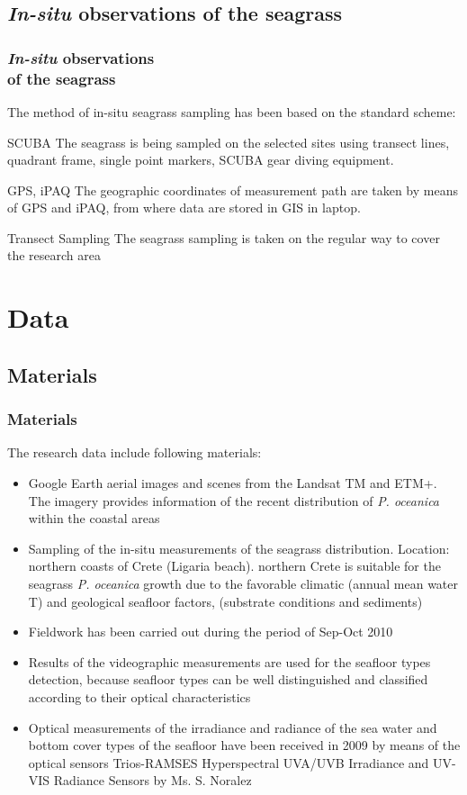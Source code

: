 \documentclass[pdflatex,compress,9pt,
	xcolor={dvipsnames,dvipsnames,svgnames,x11names,table},
	hyperref={colorlinks = true,breaklinks = true, urlcolor = NavyBlue, breaklinks = true}]{beamer}
\begin{document}
\subsection{\emph{In-situ} observations of the seagrass}
\begin{frame}\frametitle{\emph{In-situ} observations \\of the seagrass}
The method of in-situ seagrass sampling has been based on the standard scheme:

\begin{alertblock}{SCUBA}
The seagrass is being sampled on the selected sites using transect lines, quadrant frame, single point markers, \ac{SCUBA} gear diving equipment.
\end{alertblock}

\begin{block}{GPS, iPAQ}
The geographic coordinates of measurement path are taken by means of GPS and iPAQ, from where data are stored in GIS in laptop.
\end{block}

\begin{block}{Transect Sampling}
The seagrass sampling is taken on the regular way to cover the research area
\end{block}

\end{frame}

\section{Data}
\subsection{Materials}
\begin{frame}\frametitle{Materials}
The research data include following materials:
\begin{itemize}
	\item Google Earth aerial images and scenes from the \ac{Landsat TM} and ETM+. The imagery provides information of the recent distribution of \emph{P. oceanica} within the coastal areas
	\item Sampling of the in-situ measurements of the seagrass distribution. Location: northern coasts of Crete (Ligaria beach). northern Crete is suitable for the seagrass \emph{P. oceanica} growth due to the favorable climatic (annual mean water T) and geological seafloor factors, (substrate conditions and sediments)
	\item Fieldwork has been carried out during the period of Sep-Oct 2010
	\item Results of the videographic measurements are used for the seafloor types detection, because seafloor types can be well distinguished and classified according to their optical characteristics
	\item Optical measurements of the irradiance and radiance of the sea water and bottom cover types of the seafloor have been received in 2009 by means of the optical sensors \ac{Trios-RAMSES} Hyperspectral UVA/UVB Irradiance and UV-VIS Radiance Sensors by Ms. S. Noralez
\end{itemize}
\end{frame}
\end{document}
